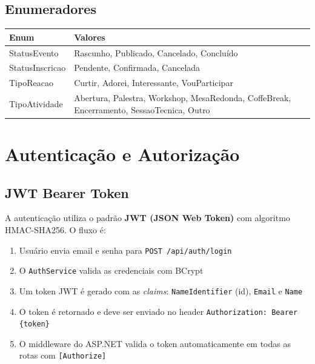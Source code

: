 \documentclass[11pt, a4paper, oneside]{article}
\begin{document}
\subsection{Enumeradores}

\begin{longtable}{L{4cm} L{10.5cm}}
\toprule
{}
\color{white}\textbf{Enum} & \color{white}\textbf{Valores} \\
\midrule
\endhead
StatusEvento & Rascunho, Publicado, Cancelado, Concluído \\
StatusInscricao & Pendente, Confirmada, Cancelada \\
TipoReacao & Curtir, Adorei, Interessante, VouParticipar \\
TipoAtividade &     Abertura, Palestra, Workshop, MesaRedonda, CoffeBreak, Encerramento, SessaoTecnica, Outro\\
\bottomrule
\end{longtable}

\section{Autenticação e Autorização}

\subsection{JWT Bearer Token}

A autenticação utiliza o padrão \textbf{JWT (JSON Web Token)} com algoritmo HMAC-SHA256. O fluxo é:

\begin{enumerate}
  \item Usuário envia email e senha para \texttt{POST /api/auth/login}
  \item O \texttt{AuthService} valida as credenciais com BCrypt
  \item Um token JWT é gerado com as \textit{claims}: \texttt{NameIdentifier} (id), \texttt{Email} e \texttt{Name}
  \item O token é retornado e deve ser enviado no header \texttt{Authorization: Bearer \{token\}}
  \item O middleware do ASP.NET valida o token automaticamente em todas as rotas com \texttt{[Authorize]}
\end{enumerate}
\end{document}
